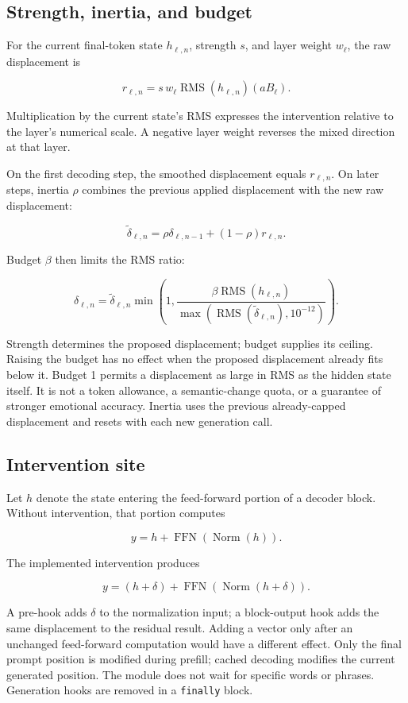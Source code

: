 \documentclass[manuscript,screen,nonacm]{acmart}
\begin{document}
\subsection{Strength, inertia, and
budget}\label{strength-inertia-and-budget}

For the current final-token state \(h_{\ell,n}\), strength \(s\), and
layer weight \(w_\ell\), the raw displacement is

\[
r_{\ell,n}=s\,w_\ell\operatorname{RMS}(h_{\ell,n})(aB_\ell).
\]

Multiplication by the current state's RMS expresses the intervention
relative to the layer's numerical scale. A negative layer weight
reverses the mixed direction at that layer.

On the first decoding step, the smoothed displacement equals
\(r_{\ell,n}\). On later steps, inertia \(\rho\) combines the previous
applied displacement with the new raw displacement:

\[
\widetilde\delta_{\ell,n}=\rho\delta_{\ell,n-1}+(1-\rho)r_{\ell,n}.
\]

Budget \(\beta\) then limits the RMS ratio:

\[
\delta_{\ell,n}=\widetilde\delta_{\ell,n}
\min\left(1,
\frac{\beta\operatorname{RMS}(h_{\ell,n})}
{\max(\operatorname{RMS}(\widetilde\delta_{\ell,n}),10^{-12})}
\right).
\]

Strength determines the proposed displacement; budget supplies its
ceiling. Raising the budget has no effect when the proposed displacement
already fits below it. Budget 1 permits a displacement as large in RMS
as the hidden state itself. It is not a token allowance, a
semantic-change quota, or a guarantee of stronger emotional accuracy.
Inertia uses the previous already-capped displacement and resets with
each new generation call.

\subsection{Intervention site}\label{intervention-site}

Let \(h\) denote the state entering the feed-forward portion of a
decoder block. Without intervention, that portion computes

\[
y=h+\operatorname{FFN}(\operatorname{Norm}(h)).
\]

The implemented intervention produces

\[
y=(h+\delta)+\operatorname{FFN}(\operatorname{Norm}(h+\delta)).
\]

A pre-hook adds \(\delta\) to the normalization input; a block-output
hook adds the same displacement to the residual result. Adding a vector
only after an unchanged feed-forward computation would have a different
effect. Only the final prompt position is modified during prefill;
cached decoding modifies the current generated position. The module does
not wait for specific words or phrases. Generation hooks are removed in
a \nolinkurl{finally} block.
\end{document}
